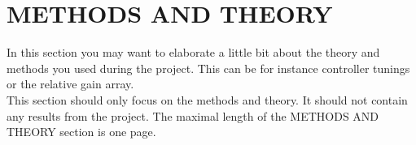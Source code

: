 \section*{METHODS AND THEORY }\label{sec:METHODS}
In this section you may want to elaborate a little bit about the theory and methods you used during the project. This can be for instance controller tunings or the relative gain array. \\
\indent This section should only focus on the methods and theory. It should not contain any results from the project. The maximal length of the METHODS AND THEORY section is one page.  